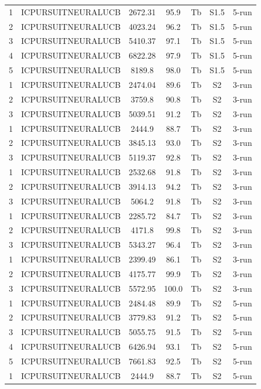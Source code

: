 \documentclass[11pt]{article}
\begin{document}
\begin{center}
\begin{longtable}{|c|c|c|c|c|c|c|}
1 & ICPURSUITNEURALUCB & 2672.31 & 95.9 & Tb & S1.5 & 5-run \\
2 & ICPURSUITNEURALUCB & 4023.24 & 96.2 & Tb & S1.5 & 5-run \\
3 & ICPURSUITNEURALUCB & 5410.37 & 97.1 & Tb & S1.5 & 5-run \\
4 & ICPURSUITNEURALUCB & 6822.28 & 97.9 & Tb & S1.5 & 5-run \\
5 & ICPURSUITNEURALUCB & 8189.8 & 98.0 & Tb & S1.5 & 5-run \\
1 & ICPURSUITNEURALUCB & 2474.04 & 89.6 & Tb & S2 & 3-run \\
2 & ICPURSUITNEURALUCB & 3759.8 & 90.8 & Tb & S2 & 3-run \\
3 & ICPURSUITNEURALUCB & 5039.51 & 91.2 & Tb & S2 & 3-run \\
1 & ICPURSUITNEURALUCB & 2444.9 & 88.7 & Tb & S2 & 3-run \\
2 & ICPURSUITNEURALUCB & 3845.13 & 93.0 & Tb & S2 & 3-run \\
3 & ICPURSUITNEURALUCB & 5119.37 & 92.8 & Tb & S2 & 3-run \\
1 & ICPURSUITNEURALUCB & 2532.68 & 91.8 & Tb & S2 & 3-run \\
2 & ICPURSUITNEURALUCB & 3914.13 & 94.2 & Tb & S2 & 3-run \\
3 & ICPURSUITNEURALUCB & 5064.2 & 91.8 & Tb & S2 & 3-run \\
1 & ICPURSUITNEURALUCB & 2285.72 & 84.7 & Tb & S2 & 3-run \\
2 & ICPURSUITNEURALUCB & 4171.8 & 99.8 & Tb & S2 & 3-run \\
3 & ICPURSUITNEURALUCB & 5343.27 & 96.4 & Tb & S2 & 3-run \\
1 & ICPURSUITNEURALUCB & 2399.49 & 86.1 & Tb & S2 & 3-run \\
2 & ICPURSUITNEURALUCB & 4175.77 & 99.9 & Tb & S2 & 3-run \\
3 & ICPURSUITNEURALUCB & 5572.95 & 100.0 & Tb & S2 & 3-run \\
1 & ICPURSUITNEURALUCB & 2484.48 & 89.9 & Tb & S2 & 5-run \\
2 & ICPURSUITNEURALUCB & 3779.83 & 91.2 & Tb & S2 & 5-run \\
3 & ICPURSUITNEURALUCB & 5055.75 & 91.5 & Tb & S2 & 5-run \\
4 & ICPURSUITNEURALUCB & 6426.94 & 93.1 & Tb & S2 & 5-run \\
5 & ICPURSUITNEURALUCB & 7661.83 & 92.5 & Tb & S2 & 5-run \\
1 & ICPURSUITNEURALUCB & 2444.9 & 88.7 & Tb & S2 & 5-run \\

\end{longtable}
\end{center}
\end{document}
